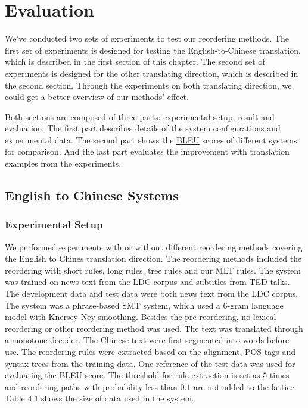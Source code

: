 
\chapter{Evaluation}
\label{ch:Evaluation}

We've conducted two sets of experiments to test our reordering methods. The first set of experiments is designed for testing the English-to-Chinese translation, which is described in the first section of this chapter. The second set of experiments is designed for the other translating direction, which is described in the second section. Through the experiments on both translating direction, we could get a better overview of our methods' effect.

Both sections are composed of three parts: experimental setup, result and evaluation. The first part describes details of the system configurations and experimental data. The second part shows the \hyperref[ch:Foundations:sec:bleu]{BLEU} scores of different systems for comparison. And the last part evaluates the improvement with translation examples from the experiments.


\section{English to Chinese Systems}
\label{ch:Evaluation:sec:enw}

\subsection{Experimental Setup}
We performed experiments with or without different reordering methods covering the English to Chines translation direction. The reordering methods included the reordering with short rules, long rules, tree rules and our MLT rules. The system was trained on news text from the LDC corpus and subtitles from TED talks. The development data and test data were both news text from the LDC corpus. The system was a phrase-based SMT system, which used a $6$-gram language model with Knersey-Ney smoothing. Besides the pre-reordering, no lexical reordering or other reordering method was used. The text was translated through a monotone decoder. The Chinese text were first segmented into words before use.
The reordering rules were extracted based on the alignment, POS tags and syntax trees from the training data. One reference of the test data was used for evaluating the BLEU score. The threshold for rule extraction is set as $5$ times and reordering paths with probability less than $0.1$ are not added to the lattice. Table $4.1$ shows the size of data used in the system. %

